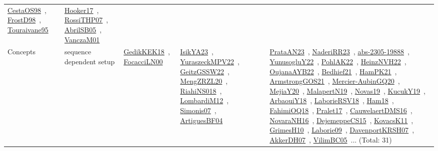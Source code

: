 {\begin{longtable}{lp{3cm}>{\raggedright\arraybackslash}p{6cm}>{\raggedright\arraybackslash}p{6cm}>{\raggedright\arraybackslash}p{8cm}}
\href{works/CestaOS98.pdf}{CestaOS98}~\cite{CestaOS98}, \href{works/FrostD98.pdf}{FrostD98}~\cite{FrostD98}, \href{works/Touraivane95.pdf}{Touraivane95}~\cite{Touraivane95} & \href{works/Hooker17.pdf}{Hooker17}~\cite{Hooker17}, \href{works/RossiTHP07.pdf}{RossiTHP07}~\cite{RossiTHP07}, \href{works/AbrilSB05.pdf}{AbrilSB05}~\cite{AbrilSB05}, \href{works/VanczaM01.pdf}{VanczaM01}~\cite{VanczaM01}\\
Concepts & sequence dependent setup & \href{works/GedikKEK18.pdf}{GedikKEK18}~\cite{GedikKEK18}, \href{works/FocacciLN00.pdf}{FocacciLN00}~\cite{FocacciLN00} & \href{works/IsikYA23.pdf}{IsikYA23}~\cite{IsikYA23}, \href{works/YuraszeckMPV22.pdf}{YuraszeckMPV22}~\cite{YuraszeckMPV22}, \href{works/GeitzGSSW22.pdf}{GeitzGSSW22}~\cite{GeitzGSSW22}, \href{works/MengZRZL20.pdf}{MengZRZL20}~\cite{MengZRZL20}, \href{works/RiahiNS018.pdf}{RiahiNS018}~\cite{RiahiNS018}, \href{works/LombardiM12.pdf}{LombardiM12}~\cite{LombardiM12}, \href{works/Simonis07.pdf}{Simonis07}~\cite{Simonis07}, \href{works/ArtiguesBF04.pdf}{ArtiguesBF04}~\cite{ArtiguesBF04} & \href{works/PrataAN23.pdf}{PrataAN23}~\cite{PrataAN23}, \href{works/NaderiRR23.pdf}{NaderiRR23}~\cite{NaderiRR23}, \href{works/abs-2305-19888.pdf}{abs-2305-19888}~\cite{abs-2305-19888}, \href{works/YunusogluY22.pdf}{YunusogluY22}~\cite{YunusogluY22}, \href{works/PohlAK22.pdf}{PohlAK22}~\cite{PohlAK22}, \href{works/HeinzNVH22.pdf}{HeinzNVH22}~\cite{HeinzNVH22}, \href{works/OujanaAYB22.pdf}{OujanaAYB22}~\cite{OujanaAYB22}, \href{works/Bedhief21.pdf}{Bedhief21}~\cite{Bedhief21}, \href{works/HamPK21.pdf}{HamPK21}~\cite{HamPK21}, \href{works/ArmstrongGOS21.pdf}{ArmstrongGOS21}~\cite{ArmstrongGOS21}, \href{works/Mercier-AubinGQ20.pdf}{Mercier-AubinGQ20}~\cite{Mercier-AubinGQ20}, \href{works/MejiaY20.pdf}{MejiaY20}~\cite{MejiaY20}, \href{works/MalapertN19.pdf}{MalapertN19}~\cite{MalapertN19}, \href{works/Novas19.pdf}{Novas19}~\cite{Novas19}, \href{works/KucukY19.pdf}{KucukY19}~\cite{KucukY19}, \href{works/ArbaouiY18.pdf}{ArbaouiY18}~\cite{ArbaouiY18}, \href{works/LaborieRSV18.pdf}{LaborieRSV18}~\cite{LaborieRSV18}, \href{works/Ham18.pdf}{Ham18}~\cite{Ham18}, \href{works/FahimiOQ18.pdf}{FahimiOQ18}~\cite{FahimiOQ18}, \href{works/Pralet17.pdf}{Pralet17}~\cite{Pralet17}, \href{works/CauwelaertDMS16.pdf}{CauwelaertDMS16}~\cite{CauwelaertDMS16}, \href{works/NovaraNH16.pdf}{NovaraNH16}~\cite{NovaraNH16}, \href{works/DejemeppeCS15.pdf}{DejemeppeCS15}~\cite{DejemeppeCS15}, \href{works/KovacsK11.pdf}{KovacsK11}~\cite{KovacsK11}, \href{works/GrimesH10.pdf}{GrimesH10}~\cite{GrimesH10}, \href{works/Laborie09.pdf}{Laborie09}~\cite{Laborie09}, \href{works/DavenportKRSH07.pdf}{DavenportKRSH07}~\cite{DavenportKRSH07}, \href{works/AkkerDH07.pdf}{AkkerDH07}~\cite{AkkerDH07}, \href{works/VilimBC05.pdf}{VilimBC05}~\cite{VilimBC05}... (Total: 31)\\

\end{longtable}}
